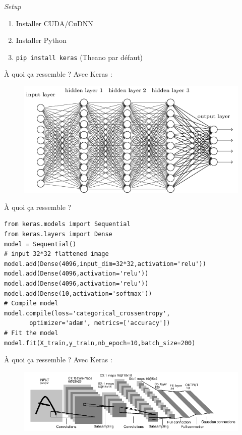 \documentclass{beamer}
\begin{document}
\begin{frame}{\textit{Setup}}

\begin{enumerate}
	\item Installer CUDA/CuDNN
    \item Installer Python
    \item \texttt{pip install keras} (Theano par défaut)
\end{enumerate}

\end{frame}

\begin{frame}[fragile]{À quoi ça ressemble ?}
Avec Keras :
\begin{figure}
	\includegraphics[width=\textwidth]{fully_connected}
\end{figure}
\end{frame}

\begin{frame}[fragile]{À quoi ça ressemble ?}
\begin{verbatim}
from keras.models import Sequential
from keras.layers import Dense
model = Sequential()
# input 32*32 flattened image
model.add(Dense(4096,input_dim=32*32,activation='relu'))
model.add(Dense(4096,activation='relu'))
model.add(Dense(4096,activation='relu'))
model.add(Dense(10,activation='softmax'))
# Compile model
model.compile(loss='categorical_crossentropy',
       optimizer='adam', metrics=['accuracy'])
# Fit the model
model.fit(X_train,y_train,nb_epoch=10,batch_size=200)
\end{verbatim}
\end{frame}

\begin{frame}[fragile]{À quoi ça ressemble ?}
Avec Keras :
\begin{figure}
	\includegraphics[width=\textwidth]{lenet5}
\end{figure}
\end{frame}
\end{document}
